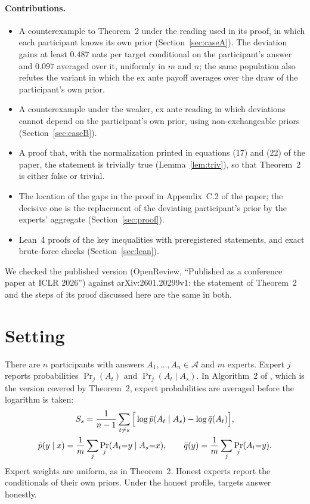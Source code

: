 \documentclass[11pt]{article}
\theoremstyle{remark}
\newcommand{\cA}{\mathcal{A}}
\newcommand{\pb}{\bar p}
\newcommand{\qb}{\bar q}
\begin{document}
\paragraph{Contributions.}
\begin{itemize}
\item A counterexample to Theorem~2 under the reading used in its proof, in which each participant knows its own prior (Section~\ref{sec:caseA}). The deviation gains at least $0.487$ nats per target conditional on the participant's answer and $0.097$ averaged over it, uniformly in $m$ and $n$; the same population also refutes the variant in which the ex ante payoff averages over the draw of the participant's own prior.
\item A counterexample under the weaker, ex ante reading in which deviations cannot depend on the participant's own prior, using non-exchangeable priors (Section~\ref{sec:caseB}).
\item A proof that, with the normalization printed in equations (17) and (22) of the paper, the statement is trivially true (Lemma~\ref{lem:triv}), so that Theorem~2 is either false or trivial.
\item The location of the gaps in the proof in Appendix~C.2 of the paper; the decisive one is the replacement of the deviating participant's prior by the experts' aggregate (Section~\ref{sec:proof}).
\item Lean~4 proofs of the key inequalities with preregistered statements, and exact brute-force checks (Section~\ref{sec:lean}).
\end{itemize}
We checked the published version (OpenReview, ``Published as a conference paper at ICLR 2026'') against arXiv:2601.20299v1: the statement of Theorem~2 and the steps of its proof discussed here are the same in both.

\section{Setting}\label{sec:setting}

There are $n$ participants with answers $A_1,\dots,A_n\in\cA$ and $m$ experts. Expert $j$ reports probabilities $\Pr_j(A_t)$ and $\Pr_j(A_t\mid A_s)$. In Algorithm~2 of \citet{qiu2026truthfulness}, which is the version covered by Theorem~2, expert probabilities are averaged before the logarithm is taken:
\begin{gather}
S_s=\frac1{n-1}\sum_{t\neq s}\Big[\log\pb(A_t\mid A_s)-\log\qb(A_t)\Big],\label{eq:score}\\
\pb(y\mid x)=\frac1m\sum_j\Pr_j(A_t{=}y\mid A_s{=}x),\qquad \qb(y)=\frac1m\sum_j\Pr_j(A_t{=}y).\notag
\end{gather}
Expert weights are uniform, as in Theorem~2. Honest experts report the conditionals of their own priors. Under the honest profile, targets answer honestly.
\end{document}
